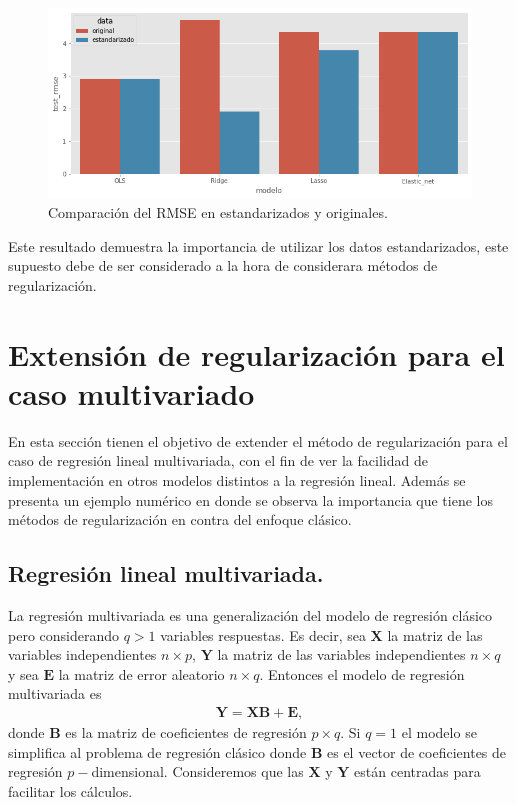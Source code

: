 \documentclass{article}
\newcommand{\X}{\mathbf{X}}
\newcommand{\Y}{\mathbf{Y}}
\newcommand{\E}{\mathbf{E}}
\newcommand{\B}{\mathbf{B}}
\begin{document}
\begin{figure}[H]
    \centering
    \includegraphics[scale=0.4]{figure/comparacion_errores_ejer2.png}
    \caption{Comparación del RMSE  en estandarizados y originales.}
    \label{fig:comparacion_errores_ejer2}
\end{figure}
Este resultado demuestra la importancia de utilizar los datos estandarizados, este supuesto debe de ser considerado a la hora de considerara métodos de regularización.


\section{Extensión de regularización para el caso multivariado}
\label{multivariado}
En esta sección tienen el objetivo de extender el método de regularización para el caso de regresión lineal multivariada, con el fin de ver la facilidad de implementación en otros modelos distintos a la regresión lineal. Además se presenta un ejemplo numérico en donde se observa la importancia que tiene los métodos de regularización en contra del enfoque clásico. 

\subsection{Regresión lineal multivariada.}
La regresión multivariada es una generalización del modelo de regresión clásico pero considerando $q>1$ variables respuestas. Es decir, sea $\X$ la matriz de las variables independientes $n\times p$, $\Y$ la matriz de las variables independientes $n\times q$ y sea $\E$ la matriz de error aleatorio $n\times q$. Entonces el modelo de regresión multivariada es
\begin{align}
        \Y = \X \B +\E,
\end{align}
donde $\B$ es la matriz de coeficientes de regresión $p\times q$. Si $q=1$ el modelo se simplifica al problema de regresión clásico donde $\B$ es el vector de coeficientes de regresión $p-$dimensional. Consideremos que las $\X$ y $\Y$ están centradas para facilitar los cálculos.\\
\end{document}
